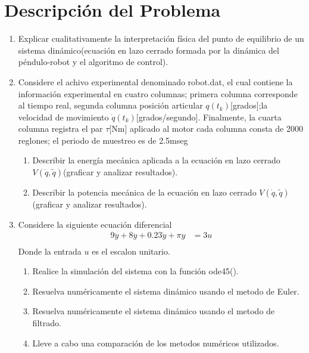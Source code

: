 \documentclass[12pt]{article}
\begin{document}
\section{Descripción del Problema}
\begin{enumerate}
    \item Explicar cualitativamente la interpretación física del punto de equilibrio de un sistema dinámico(ecuación en lazo cerrado formada por la dinámica del péndulo-robot y el algoritmo de control).
    \item Considere el achivo experimental denominado robot.dat, el cual contiene la información experimental en cuatro columnas; primera columna corresponde al tiempo real, segunda columna posición articular $q(t_k)$[grados];la velocidad de movimiento $\dot{q}(t_k)$[grados/segundo]. Finalmente, la cuarta columna registra el par $\tau$[Nm] aplicado al motor cada columna consta de 2000 reglones; el periodo de muestreo es de 2.5mseg
    \begin{enumerate}
        \item Describir la energía mecánica aplicada a la ecuación en lazo cerrado $V(\dot{q},\tilde{q})$(graficar y analizar resultados).
        \item  Describir la potencia mecánica de la ecuación en lazo cerrado $V(\dot{q},\tilde{q})$(graficar y analizar resultados).
    \end{enumerate} 
    \item Considere la siguiente ecuación diferencial
    \begin{equation}
        \begin{split}
            9\dddot{y}+8\ddot{y}+0.23\dot{y}+\pi y&=3u\\
        \end{split}
        \label{eq:ode}
    \end{equation}
    Donde la entrada $u$ es el escalon unitario.
    \begin{enumerate}
        \item Realice la simulación del sistema con la función ode45().
        \item Resuelva numéricamente el sistema dinámico usando el metodo de Euler.
        \item Resuelva numéricamente el sistema dinámico usando el metodo de filtrado.
        \item Lleve a cabo una comparación de los metodos numéricos utilizados.
    \end{enumerate}
\end{enumerate}
\end{document}
